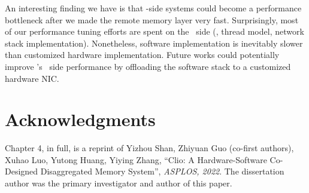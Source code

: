 An interesting finding we have is that \CN-side systems
could become a performance bottleneck after we made the remote memory layer very fast.
Surprisingly, most of our performance tuning efforts are spent on the \CN\ side (\eg, thread model, network stack implementation).
Nonetheless, software implementation is inevitably slower than customized hardware implementation.
Future works could potentially improve \sys's \CN\ side performance by offloading the software stack to a customized hardware NIC.

\section{Acknowledgments}
Chapter 4, in full, is a reprint of Yizhou Shan, Zhiyuan Guo (co-first authors), Xuhao Luo, Yutong Huang, Yiying Zhang, ``Clio: A Hardware-Software Co-Designed Disaggregated Memory System'', \textit{ASPLOS, 2022}. The dissertation author was the primary investigator and author of this paper.